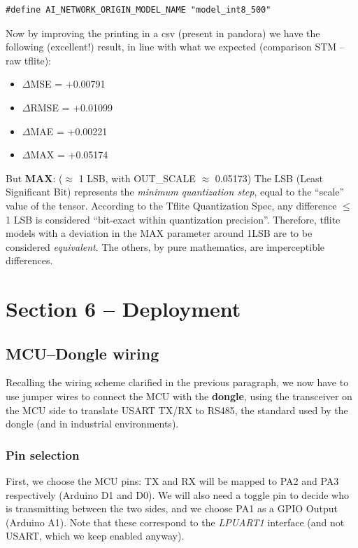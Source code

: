 \begin{verbatim}
#define AI_NETWORK_ORIGIN_MODEL_NAME "model_int8_500"
\end{verbatim}

Now by improving the printing in a csv (present in pandora) we have the following (excellent!) result, in line with what we expected (comparison STM – raw tflite):

\begin{itemize}
    \item $\Delta$MSE = +0.00791
    \item $\Delta$RMSE = +0.01099
    \item $\Delta$MAE = +0.00221
    \item $\Delta$MAX = +0.05174
\end{itemize}
But \textbf{MAX}: ($\approx$ 1 LSB, with OUT\_SCALE $\approx$ 0.05173)
The LSB (Least Significant Bit) represents the \textit{minimum quantization step}, equal to the ``scale'' value of the tensor. According to the Tflite Quantization Spec, any difference $\leq$ 1 LSB is considered ``bit-exact within quantization precision''. Therefore, tflite models with a deviation in the MAX parameter around 1LSB are to be considered \textit{equivalent}. The others, by pure mathematics, are imperceptible differences.

\section{Section 6 -- Deployment}

\subsection{MCU--Dongle wiring}

Recalling the wiring scheme clarified in the previous paragraph, we now have to use jumper wires to connect the MCU with the \textbf{dongle}, using the transceiver on the MCU side to translate USART TX/RX to RS485, the standard used by the dongle (and in industrial environments).

\subsubsection{Pin selection}

First, we choose the MCU pins: TX and RX will be mapped to PA2 and PA3 respectively (Arduino D1 and D0). We will also need a toggle pin to decide who is transmitting between the two sides, and we choose PA1 as a GPIO Output (Arduino A1). Note that these correspond to the \textit{LPUART1} interface (and not USART, which we keep enabled anyway).

